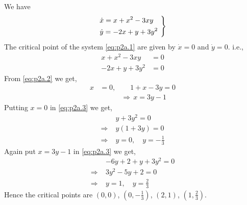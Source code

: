 \documentclass[../main-sheet.tex]{subfiles}
\begin{document}
\begin{soln}[a]
    We have
    \begin{equation}
        \begin{rcases}
            \displaystyle\dot{x}=x+x^2-3xy\quad\\
            \displaystyle\dot{y}=-2x+y+3y^2
        \end{rcases}
        \label{eq:p2a.1}
    \end{equation}
    The critical point of the system \eqref{eq:p2a.1} are given by \(\dot{x}=0\) and \(\dot{y}=0\). i.e.,
    \begin{align}
        x+x^2-3xy&=0\label{eq:p2a.2}\\
        -2x+y+3y^2&=0\label{eq:p2a.3}
    \end{align}
    From \eqref{eq:p2a.2} we get,
    \begin{align*}
        x&=0, \qquad 1+x-3y=0\\
        &\qquad\quad\Rightarrow\,x=3y-1
    \end{align*}
    Putting \(x=0\) in \eqref{eq:p2a.3} we get,
    \begin{align*}
        &y+3y^2=0\\
        \Rightarrow\;&y(1+3y)=0\\
        \Rightarrow\;&y=0,\quad y=-\frac{1}{3}
    \end{align*}
    Again put \(x=3y-1\) in \eqref{eq:p2a.3} we get,
    \begin{align*}
        &-6y+2+y+3y^2=0\\
        \Rightarrow\;&3y^2-5y+2=0\\
        \Rightarrow\;&y=1,\quad y=\frac{2}{3}
    \end{align*}
    Hence the critical points are \((0,0)\), \((0,-\frac{1}{3})\), \((2,1)\), \((1,\frac{2}{3})\).\\
    

\end{soln}
\end{document}
